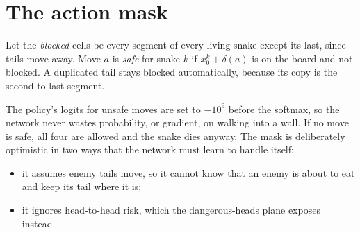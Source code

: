 \section{The action mask}

\begin{defbox}
Let the \emph{blocked} cells be every segment of every living snake except its last,
since tails move away. Move $a$ is \emph{safe} for snake $k$ if
$x^k_0+\delta(a)$ is on the board and not blocked. A duplicated tail stays blocked
automatically, because its copy is the second-to-last segment.
\end{defbox}

The policy's logits for unsafe moves are set to $-10^9$ before the softmax, so the network
never wastes probability, or gradient, on walking into a wall. If no move is safe, all
four are allowed and the snake dies anyway. The mask is deliberately optimistic in two
ways that the network must learn to handle itself:
\begin{itemize}
\item it assumes enemy tails move, so it cannot know that an enemy is about to eat and
  keep its tail where it is;
\item it ignores head-to-head risk, which the dangerous-heads plane exposes instead.
\end{itemize}
